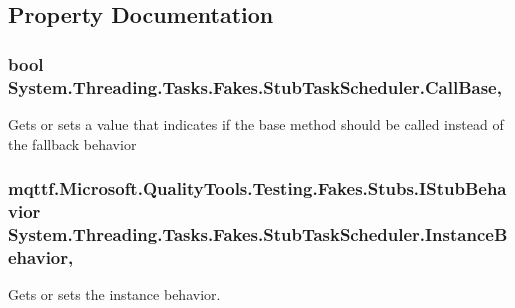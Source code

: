 \subsection{Property Documentation}
\hypertarget{class_system_1_1_threading_1_1_tasks_1_1_fakes_1_1_stub_task_scheduler_a40e08f6a8e4f070679cf2316fbb5bf28}{
\subsubsection[{Call\-Base}]{\setlength{\rightskip}{0pt plus 5cm}bool System.\-Threading.\-Tasks.\-Fakes.\-Stub\-Task\-Scheduler.\-Call\-Base\hspace{0.3cm}{\ttfamily [get]}, {\ttfamily [set]}}}\label{class_system_1_1_threading_1_1_tasks_1_1_fakes_1_1_stub_task_scheduler_a40e08f6a8e4f070679cf2316fbb5bf28}


Gets or sets a value that indicates if the base method should be called instead of the fallback behavior

\hypertarget{class_system_1_1_threading_1_1_tasks_1_1_fakes_1_1_stub_task_scheduler_a1cafe643c8a0b41395c17941c71d6f93}{
\subsubsection[{Instance\-Behavior}]{\setlength{\rightskip}{0pt plus 5cm}mqttf.\-Microsoft.\-Quality\-Tools.\-Testing.\-Fakes.\-Stubs.\-I\-Stub\-Behavior System.\-Threading.\-Tasks.\-Fakes.\-Stub\-Task\-Scheduler.\-Instance\-Behavior\hspace{0.3cm}{\ttfamily [get]}, {\ttfamily [set]}}}\label{class_system_1_1_threading_1_1_tasks_1_1_fakes_1_1_stub_task_scheduler_a1cafe643c8a0b41395c17941c71d6f93}


Gets or sets the instance behavior.

